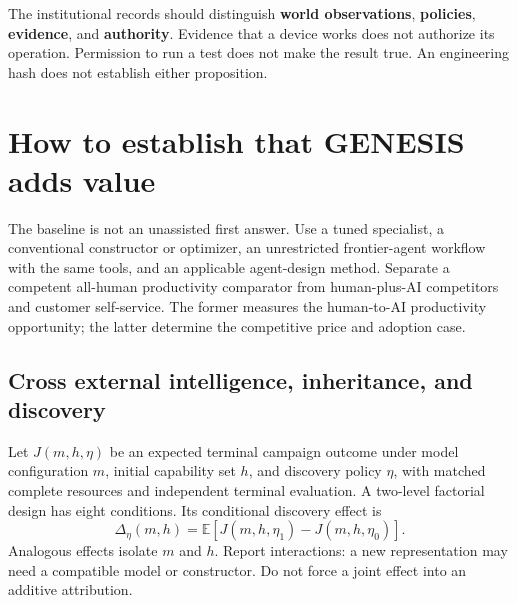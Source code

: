 \documentclass[11pt,letterpaper]{article}
\newcommand{\E}{\mathbb{E}}
\theoremstyle{remark}\newtheorem{remark}{Remark}[section]
\begin{document}
The institutional records should distinguish \textbf{world observations}, \textbf{policies}, \textbf{evidence}, and \textbf{authority}. Evidence that a device works does not authorize its operation. Permission to run a test does not make the result true. An engineering hash does not establish either proposition.

\section{How to establish that GENESIS adds value}
\label{sec:evaluation}
The baseline is not an unassisted first answer. Use a tuned specialist, a conventional constructor or optimizer, an unrestricted frontier-agent workflow with the same tools, and an applicable agent-design method. Separate a competent all-human productivity comparator from human-plus-AI competitors and customer self-service. The former measures the human-to-AI productivity opportunity; the latter determine the competitive price and adoption case.

\subsection{Cross external intelligence, inheritance, and discovery}
Let $J(m,h,\eta)$ be an expected terminal campaign outcome under model configuration $m$, initial capability set $h$, and discovery policy $\eta$, with matched complete resources and independent terminal evaluation. A two-level factorial design has eight conditions. Its conditional discovery effect is
\begin{equation}
\Delta_{\eta}(m,h)=\E[J(m,h,\eta_1)-J(m,h,\eta_0)].
\label{eq:factorial}
\end{equation}
Analogous effects isolate $m$ and $h$. Report interactions: a new representation may need a compatible model or constructor. Do not force a joint effect into an additive attribution.
\end{document}
